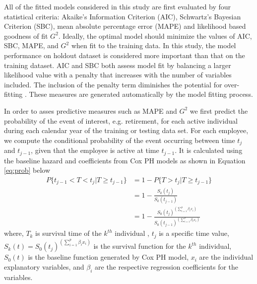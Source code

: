 \documentclass[12pt,letterpaper]{article}
\begin{document}
All of the fitted models considered in this study are first evaluated by four statistical criteria:  Akaike’s Information Criterion (AIC), Schwartz’s Bayesian Criterion (SBC), mean absolute percentage error (MAPE) and likelihood based goodness of fit $G^2$. Ideally, the optimal model should minimize the values of AIC, SBC, MAPE, and $G^2$ when fit to the training data. In this study, the model performance on holdout dataset is considered more important than that on the training dataset.
AIC and SBC both assess model fit by balancing a larger likelihood value with a penalty that increases with the number of variables included. The inclusion of the penalty term diminishes the potential for over-fitting \citep{allison2010,hosmer2013}. These measures are generated automatically by the model fitting process.

In order to asses predictive measures such as MAPE and $G^2$ we first predict the probability of the event of interest, e.g. retirement, for each active individual during each calendar year of the training or testing data set. For each employee, we compute the conditional probability of the event occurring between time $t_j$ and $t_{j-1}$, given that the employee is active at time $t_{j-1}$. It is calculated using the baseline hazard and coefficients from Cox PH models as shown in Equation \ref{eq:prob} below
\begin{equation}
\label{eq:prob}
\begin{split}%
P\{t_{j-1}<T<t_j|T \ge t_{j-1}\} &=1-P\{T>t_j|T \ge t_{j-1}\}\\
&=1-\frac{S_k(t_j)}{S_k{(t_{j-1})}}   \\
&=1-\frac{{S_0(t_j)}^{(\sum_{i=1}^{p}\beta_ix_i)}}{   {S_0(t_{j-1})}^{(\sum_{i=1}^{p}\beta_ix_i)}}
\end{split}
\end{equation}
where, $T_k$ is survival time of the $k^{th}$ individual , $t_j$ is a specific time value, $S_k(t) = {S_0(t_j)}^{(\sum_{i=1}^{p}\beta_ix_i)}$ is the survival function for the $k^{th}$ individual, $S_0(t)$ is the baseline function generated by Cox PH model, $x_i$ are the individual explanatory variables, and $\beta_i$ are the respective regression coefficients for the variables.
\end{document}
